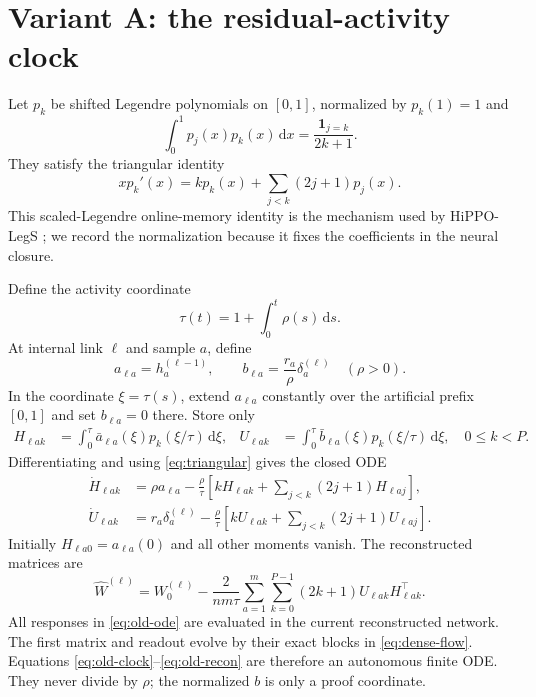 \documentclass[11pt]{article}
\theoremstyle{definition}
\theoremstyle{remark}
\newcommand{\dd}{\,\mathrm{d}}
\begin{document}
\section{Variant A: the residual-activity clock}
\label{sec:old-clock}

Let $p_k$ be shifted Legendre polynomials on $[0,1]$, normalized by
$p_k(1)=1$ and
\[
 \int_0^1p_j(x)p_k(x)\dd x=\frac{\mathbf 1_{j=k}}{2k+1}.
\]
They satisfy the triangular identity
\begin{equation}
 x p_k'(x)=k p_k(x)+\sum_{j<k}(2j+1)p_j(x).          \label{eq:triangular}
\end{equation}
This scaled-Legendre online-memory identity is the mechanism used by
HiPPO-LegS \citep{gu2020hippo}; we record the normalization because it fixes
the coefficients in the neural closure.

Define the activity coordinate
\begin{equation}
 \tau(t)=1+\int_0^t\rho(s)\dd s.                    \label{eq:old-clock}
\end{equation}
At internal link $\ell$ and sample $a$, define
\[
 a_{\ell a}=h_a^{(\ell-1)},\qquad
 b_{\ell a}=\frac{r_a}{\rho}\delta_a^{(\ell)}\quad(\rho>0).
\]
In the coordinate $\xi=\tau(s)$, extend $a_{\ell a}$ constantly over the
artificial prefix $[0,1]$ and set $b_{\ell a}=0$ there.  Store only
\begin{align}
 H_{\ell ak}&=\int_0^\tau \bar a_{\ell a}(\xi)
 p_k(\xi/\tau)\dd\xi,&
 U_{\ell ak}&=\int_0^\tau \bar b_{\ell a}(\xi)
 p_k(\xi/\tau)\dd\xi,\quad 0\le k<P.               \label{eq:old-moments}
\end{align}
Differentiating and using \eqref{eq:triangular} gives the closed ODE
\begin{align}
 \dot H_{\ell ak}&=\rho a_{\ell a}-\frac{\rho}{\tau}
 \left[kH_{\ell ak}+\sum_{j<k}(2j+1)H_{\ell aj}\right],\nonumber\\
 \dot U_{\ell ak}&=r_a\delta_a^{(\ell)}-\frac{\rho}{\tau}
 \left[kU_{\ell ak}+\sum_{j<k}(2j+1)U_{\ell aj}\right]. \label{eq:old-ode}
\end{align}
Initially $H_{\ell a0}=a_{\ell a}(0)$ and all other moments vanish.  The
reconstructed matrices are
\begin{equation}
 \widehat W^{(\ell)}=W_0^{(\ell)}-\frac{2}{nm\tau}
 \sum_{a=1}^m\sum_{k=0}^{P-1}(2k+1)
 U_{\ell ak}H_{\ell ak}^\top.                       \label{eq:old-recon}
\end{equation}
All responses in \eqref{eq:old-ode} are evaluated in the current reconstructed
network.  The first matrix and readout evolve by their exact blocks in
\eqref{eq:dense-flow}.  Equations \eqref{eq:old-clock}--\eqref{eq:old-recon}
are therefore an autonomous finite ODE.  They never divide by $\rho$; the
normalized $b$ is only a proof coordinate.
\end{document}
